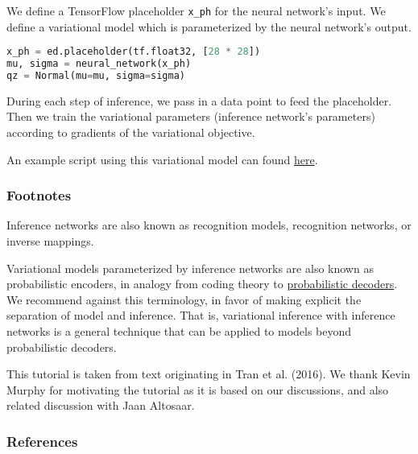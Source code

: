 We define a TensorFlow placeholder \texttt{x_ph} for the neural network's input.
We define a variational model which is parameterized by the neural network's
output.
\begin{lstlisting}[language=Python]
x_ph = ed.placeholder(tf.float32, [28 * 28])
mu, sigma = neural_network(x_ph)
qz = Normal(mu=mu, sigma=sigma)
\end{lstlisting}
During each step of inference, we pass in a data point to feed the
placeholder. Then we train the variational parameters (inference
network's parameters) according to
gradients of the variational objective.

An example script using this variational model can found
\href{https://github.com/blei-lab/edward/blob/master/examples/tf_convolutional_vae.py}
{here}.

\subsubsection{Footnotes}

Inference networks are also known as recognition models, recognition
networks, or inverse mappings.

Variational models parameterized by
inference networks are also known as probabilistic encoders, in
analogy from coding theory to
\href{tut_decoder}{probabilistic decoders}.
We recommend against this terminology,
in favor of making explicit the separation of model and inference.
That is,
variational inference with inference networks is a
general technique that can be applied to models beyond
probabilistic decoders.

This tutorial is taken from text originating in Tran et al. (2016).
We thank Kevin Murphy for motivating the tutorial as it is based
on our discussions, and also related discussion with Jaan Altosaar.

\subsubsection{References}\label{references}

